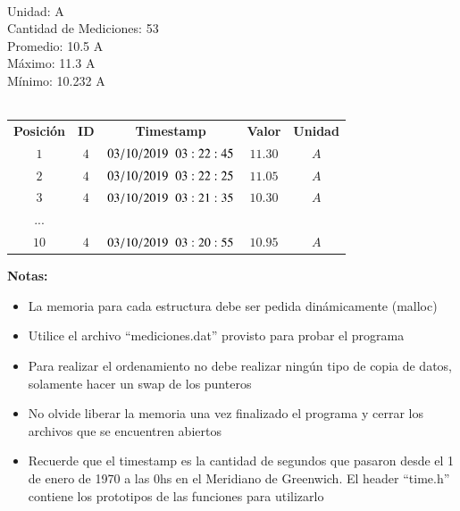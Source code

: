 \documentclass[12pt]{article} %
\begin{document}
\\
Unidad: A\\
Cantidad de Mediciones: 53\\
Promedio: 10.5 A\\
Máximo: 11.3 A\\
Mínimo: 10.232 A\\ \\
   \begin{tabular}{c c c c c}
    
     {\bf Posición}&{\bf ID}&{\bf Timestamp}&{\bf Valor}&{\bf Unidad} \\  
     $1$  &$4$&$03/10/2019 \hspace{0.2cm} 03:22:45$&$11.30$&$A$\\  
     $2$  &$4$&$03/10/2019 \hspace{0.2cm} 03:22:25$&$11.05$&$A$\\  
     $3$  &$4$&$03/10/2019 \hspace{0.2cm} 03:21:35$&$10.30$&$A$\\  
     $...$&   &                                    &       &   \\  
     $10$ &$4$&$03/10/2019 \hspace{0.2cm} 03:20:55$&$10.95$&$A$\\  
   \end{tabular}
\vspace{5mm}

{\bf Notas:}\\
\begin{itemize}
\item La memoria para cada estructura debe ser pedida dinámicamente (malloc)
\item Utilice el archivo “mediciones.dat” provisto para probar el programa
\item Para realizar el ordenamiento no debe realizar ningún tipo de copia de datos,
solamente hacer un swap de los punteros
\item No olvide liberar la memoria una vez finalizado el programa y cerrar los archivos que se encuentren abiertos
\item Recuerde que el timestamp es la cantidad de segundos que pasaron desde el 1
de enero de 1970 a las 0hs en el Meridiano de Greenwich. El header “time.h”
contiene los prototipos de las funciones para utilizarlo
\end{itemize}

 
\end{document}

